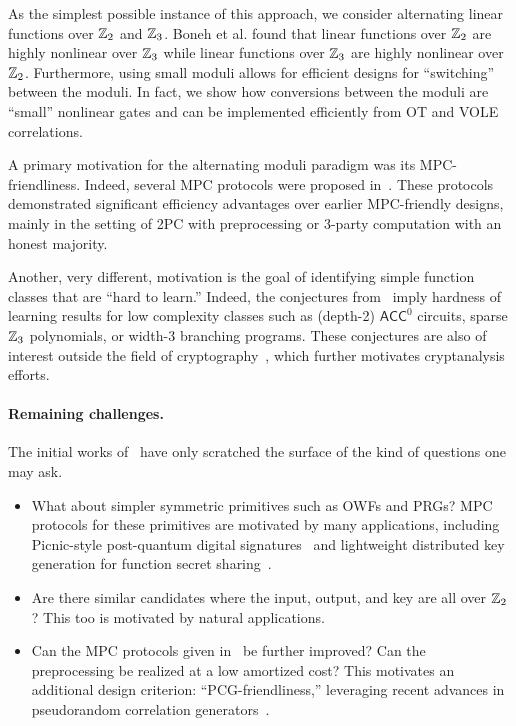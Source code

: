 As the simplest possible instance of this approach, we consider alternating linear functions over $\mathbb{Z}_2$ and $\mathbb{Z}_3$. Boneh et al. found that linear functions over $\mathbb{Z}_2$ are highly nonlinear over $\mathbb{Z}_3$ while linear functions over $\mathbb{Z}_3$ are highly nonlinear over $\mathbb{Z}_2$. Furthermore, using small moduli allows for efficient designs for ``switching'' between the moduli. In fact, we show how conversions between the moduli are “small” nonlinear gates and can be implemented efficiently from OT and VOLE correlations.
\fi

A primary motivation for the alternating moduli paradigm was its MPC-friendliness. Indeed, several MPC protocols were proposed in~\cite{boneh2018-darkmatter}. These protocols demonstrated significant efficiency advantages over earlier MPC-friendly designs, mainly in the setting of 2PC with preprocessing or 3-party computation with an honest majority.

Another, very different, motivation is the goal of identifying simple function classes that are ``hard to learn.''  Indeed,  the conjectures from~\cite{boneh2018-darkmatter} imply hardness of learning results for low complexity classes such as (depth-2) $\mathsf{ACC}^0$ circuits, sparse $\mathbb{Z}_3$ polynomials, or width-3 branching programs. These conjectures are also of interest outside the field of cryptography~\cite{Chen19,FilmusIKK20,ChenR20,KabanetsKLMO20}, which further motivates cryptanalysis efforts.

\paragraph{Remaining challenges.} The initial works of~\cite{boneh2018-darkmatter,cheon2020-adventures} have only scratched the surface of the kind of questions one may ask.
\begin{itemize}
\item
What about simpler symmetric primitives such as OWFs and PRGs? MPC protocols for these primitives are motivated by many applications, including Picnic-style post-quantum digital signatures~\cite{chase2017-picnic,kales2020-picnic} and lightweight distributed key generation for function secret sharing~\cite{boyle2015-fss}.
\item Are there similar candidates where the input, output, and key are all over $\mathbb{Z}_2$? This too is motivated by natural applications.
\item Can the MPC protocols given in~\cite{boneh2018-darkmatter} be further improved? Can the preprocessing be realized at a low amortized cost? This motivates an additional design criterion: ``PCG-friendliness,'' leveraging recent advances in pseudorandom correlation generators~\cite{BCGI18,BCGIKRS19,yang2020-ferret}.
\end{itemize}

